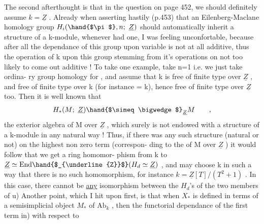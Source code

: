 The second afterthought is  that in the question on page 452,  we
should definitely assume $k=\underline{Z}$ .  Already when asserting hastily (p.453)
that an Eilenberg-Maclane homology group $H_i(\hand{$\pi$},n;\ \underline{Z})$  should automatically
inherit a structure of a k-module,  whenever \hand{$\pi$} had one,  I was feeling
unconfortable,  because after all the dependance of this group upon
variable \hand{$\pi$} is not at all additive,  thus the operation of k upon this
group stemming from it's operations on \hand{$\pi$}   not too likely to come
out additive !  To take one example,  take n=1 i.e. we just take ordina-%
ry group homology for \hand{$\pi$} ,  and assume that k is free of finite type over
$\underline{Z}$ ,  and \hand{$\pi$} free of finite type over k (for instance = k),  hence free
of finite type over $\underline{Z}$ too.  Then it is well known that
\[ H_*(M;\ \underline{Z})\hand{$\simeq \bigwedge$}_{\underline{Z}}M \qquad , \]
the exterior algebra of M  over $\underline{Z}$ ,  which surely is not endowed with a
structure of a k-module in any natural way !  Thus,  if there was any
such structure (natural or not) on the highest non zero term (correspon-%
ding to the  of M over $\underline{Z}$ )\hand{,} it would follow that we get a ring homomor-%
phism  from  k to  $\underline{Z}\simeq \mathrm{End}\hand{$_{\underline{Z}}$}(H_d\simeq \underline{Z})$ ,  and  may choose k in such a
way that there is no such homomorphism,  for instance  $k = \underline{Z}[T]/(T^2+1)$ .
In this case,  there cannot be \uline{any} isomorphism  between the $H_d$'s of the
two members of \hand{(}u)  Another point,  which I hit upon first,  is that
when  $X_*$  is defined in terms of a semisimplicial object $M_*$ of $\mathrm{Ab}_k$ ,
then the functorial dependance of the first term in) with respect to

